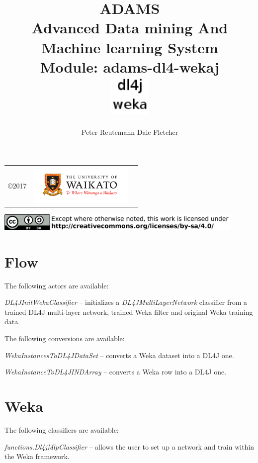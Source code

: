 \documentclass[a4paper]{book}
\title{
  \textbf{ADAMS} \\
  {\Large \textbf{A}dvanced \textbf{D}ata mining \textbf{A}nd \textbf{M}achine
  learning \textbf{S}ystem} \\
  {\Large Module: adams-dl4-wekaj} \\
  \vspace{1cm}
  \includegraphics[width=2cm]{images/dl4j-weka-module.png} \\
}
\author{
  Peter Reutemann
  Dale Fletcher
}
\begin{document}
\begin{titlepage}
\maketitle

\thispagestyle{empty}
\center
\begin{table}[b]
	\begin{tabular}{c l l}
		\parbox[c][2cm]{2cm}{\copyright 2017} &
		\parbox[c][2cm]{5cm}{\includegraphics[width=5cm]{images/coat_of_arms.pdf}} \\
	\end{tabular}
	\includegraphics[width=12cm]{images/cc.png} \\
\end{table}

\end{titlepage}

\tableofcontents

\chapter{Flow}
The following actors are available:
\begin{tight_itemize}
  \item \textit{DL4JInitWekaClassifier} -- initializes a \textit{DL4JMultiLayerNetwork}
  classifier from a trained DL4J multi-layer network, trained Weka filter and
  original Weka training data.
\end{tight_itemize}
The following conversions are available:
\begin{tight_itemize}
  \item \textit{WekaInstancesToDL4JDataSet} -- converts a Weka dataset into
  a DL4J one.
  \item \textit{WekaInstanceToDL4JINDArray} -- converts a Weka row into a
  DL4J one.
\end{tight_itemize}

\chapter{Weka}
The following classifiers are available:
\begin{tight_itemize}
  \item \textit{functions.Dl4jMlpClassifier} -- allows the user to set up a network
  and train within the Weka framework.
\end{tight_itemize}


\end{document}
